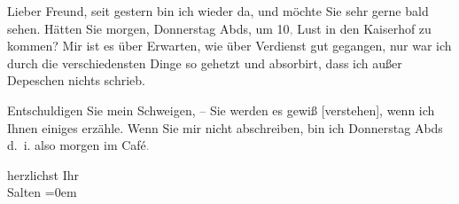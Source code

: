            \vspace{0.5em}
\pstart
           Lieber Freund, seit gestern bin ich
               wieder da, und möchte Sie sehr gerne bald sehen. Hätten Sie morgen, Donnerstag{ }Abds, um 10\textcolor{gray}{,} Lust in den Kaiserhof zu
               kommen? Mir ist es über Erwarten, wie über Verdienst gut gegangen, nur war ich durch
               die verschiedensten Dinge so gehetzt und absorbirt, dass ich außer Depeschen nichts
               schrieb.\pend
           
\pstart
           Entschuldigen Sie mein Schweigen, – Sie werden es
               gewiß {[}verstehen{]}, wenn ich Ihnen einiges erzähle. Wenn Sie mir
               nicht abschreiben, bin ich Donnerstag{ }Abds d. i. also morgen im Café\textcolor{gray}{.}\pend
           
\pstart
           herzlichst Ihr {\\[\baselineskip]}\spacefill\mbox{Salten}\pend
           \leftskip=0em{}\endnumbering{}  
      